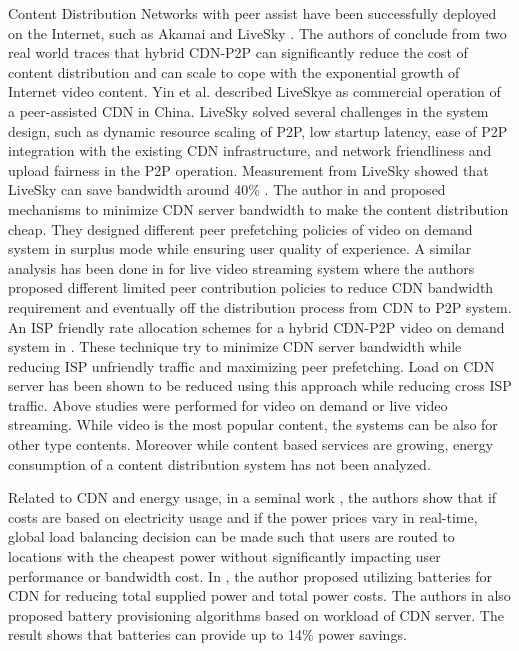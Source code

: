 \documentclass[JIP]{ipsj}
\begin{document}
Content Distribution Networks with peer assist have been successfully deployed on the Internet, such as Akamai \cite{Huang:2008:UHC:1496046.1496064} and LiveSky \cite{Yin:2010:LEC:1823746.1823750}.  
The authors of \cite{Huang:2008:UHC:1496046.1496064} conclude from two real world traces that hybrid CDN-P2P can significantly reduce the cost of content distribution and can scale to cope with the exponential growth of Internet video content.  
Yin et al. \cite{Yin:2010:LEC:1823746.1823750} described LiveSkye as commercial operation of a peer-assisted CDN in China.  
LiveSky solved several challenges in the system design, such as dynamic resource scaling of P2P, low startup latency, ease of P2P integration with the existing CDN infrastructure, and network friendliness and upload fairness in the P2P operation.  
Measurement from LiveSky showed that LiveSky can save bandwidth around 40\% \cite{Yin:2010:LEC:1823746.1823750}.
The author in \cite{Huang:2007:IVP:1282427.1282396} and \cite{huang2007peer} proposed mechanisms to minimize CDN server bandwidth to make the content distribution cheap.
They designed different peer prefetching policies of video on demand system in surplus mode while ensuring user quality of experience.
A similar analysis has been done in \cite{xu2006analysis} for live video streaming system where the authors proposed different limited peer contribution policies to reduce CDN bandwidth requirement and eventually off the distribution process from CDN to P2P system. 
An ISP friendly rate allocation schemes for a hybrid CDN-P2P video on demand system in \cite{Wang:2008:IRA:1459359.1459397}. 
These technique try to minimize CDN server bandwidth while reducing ISP unfriendly traffic and maximizing peer prefetching.
Load on CDN server has been shown to be reduced using this approach while reducing cross ISP traffic.
Above studies were performed for video on demand or live video streaming.
While video is the most popular content, the systems can be also for other type contents.
Moreover while content based services are growing, energy consumption of a content distribution system has not been analyzed.

Related to CDN and energy usage, in a seminal work \cite{qureshi2009cutting}, the authors show that if costs are based on electricity usage and if the power prices vary in real-time, global load balancing decision can be made such that users are routed to locations with the cheapest power without significantly impacting user performance or bandwidth cost.  
In \cite{Palasamudram:2012:UBR:2391229.2391240}, the author proposed utilizing batteries for CDN for reducing total supplied power and total power costs.
The authors in \cite{Palasamudram:2012:UBR:2391229.2391240} also proposed battery provisioning algorithms based on workload of CDN server. 
The result shows that batteries can provide up to 14\% power savings.
\end{document}
